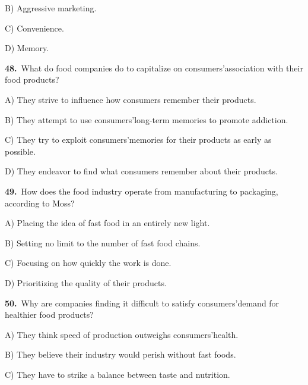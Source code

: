 \noindent\hspace{1.6em}B) Aggressive marketing.\par
\noindent\hspace{1.6em}C) Convenience.\par
\noindent\hspace{1.6em}D) Memory.\par
\smallskip
\noindent\textbf{48.}\ What do food companies do to capitalize on consumers'association with their food products?\par
\noindent\hspace{1.6em}A) They strive to influence how consumers remember their products.\par
\noindent\hspace{1.6em}B) They attempt to use consumers'long-term memories to promote addiction.\par
\noindent\hspace{1.6em}C) They try to exploit consumers'memories for their products as early as possible.\par
\noindent\hspace{1.6em}D) They endeavor to find what consumers remember about their products.\par
\smallskip
\noindent\textbf{49.}\ How does the food industry operate from manufacturing to packaging, according to Moss?\par
\noindent\hspace{1.6em}A) Placing the idea of fast food in an entirely new light.\par
\noindent\hspace{1.6em}B) Setting no limit to the number of fast food chains.\par
\noindent\hspace{1.6em}C) Focusing on how quickly the work is done.\par
\noindent\hspace{1.6em}D) Prioritizing the quality of their products.\par
\smallskip
\noindent\textbf{50.}\ Why are companies finding it difficult to satisfy consumers'demand for healthier food products?\par
\noindent\hspace{1.6em}A) They think speed of production outweighs consumers'health.\par
\noindent\hspace{1.6em}B) They believe their industry would perish without fast foods.\par
\noindent\hspace{1.6em}C) They have to strike a balance between taste and nutrition.\par
